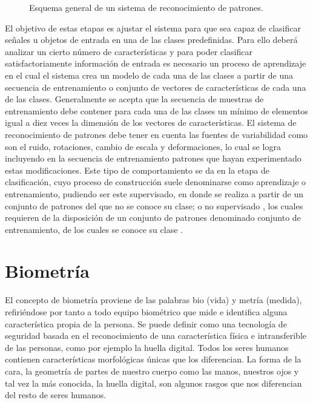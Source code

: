 \begin{figure}[htbp]
\centering
{}
\caption{Esquema general de un sistema de reconocimiento de patrones.} \label{fig:señales}
\end{figure}

El objetivo de estas etapas es ajustar el sistema para que sea capaz de clasificar señales u objetos de entrada en una de las clases predefinidas. Para ello deberá analizar un cierto número de características y para poder clasificar satisfactoriamente información de entrada es necesario un proceso de aprendizaje en el cual el sistema crea un modelo de cada una de las clases a partir de una secuencia de entrenamiento o conjunto de vectores de características de cada una de las clases. Generalmente se acepta que la secuencia de muestras de entrenamiento debe contener para cada una de las clases un mínimo de elementos igual a diez veces la dimensión de los vectores de características. El sistema de reconocimiento de patrones debe tener en cuenta las fuentes de variabilidad como son el ruido, rotaciones, cambio de escala y deformaciones, lo cual se logra incluyendo en la secuencia de entrenamiento patrones que hayan experimentado estas modificaciones. Este tipo de comportamiento se da en la etapa de clasificación, cuyo proceso de construcción suele denominarse como aprendizaje o entrenamiento, pudiendo ser este supervisado, en donde se realiza a partir de un conjunto de patrones del que no se conoce su clase; o no supervisado , los cuales requieren de la disposición de un conjunto de patrones denominado conjunto de entrenamiento, de los cuales se conoce su clase \cite{Reference8}.\\


\section{Biometría}

El concepto de biometría proviene de las palabras bio (vida) y metría (medida), refiriéndose por tanto a todo equipo biométrico que mide e identifica alguna característica propia de la persona. Se puede definir como una tecnología de seguridad basada en el reconocimiento de una característica física e intransferible de las personas, como por ejemplo la huella digital. Todos los seres humanos contienen características morfológicas únicas que los diferencian. La forma de la cara, la geometría de partes de nuestro cuerpo como las manos, nuestros ojos y tal vez la más conocida, la huella digital, son algunos rasgos que nos diferencian del resto de seres humanos.\\

